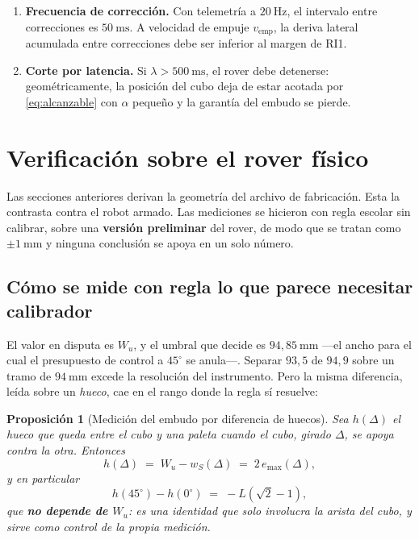 \documentclass[11pt,a4paper]{article}
\newtheorem{proposicion}[teorema]{Proposición}
\theoremstyle{definition}
\newcommand{\grados}{^{\circ}}
\begin{document}
\begin{enumerate}[label=RI\arabic*.,leftmargin=3em,itemsep=3pt]
      diferencial con giróscopo es razonable. La diferencia entre \emph{imposible} y
      \emph{razonable} es \emph{únicamente} conocer la inclinación del cubo.
\item \textbf{Frecuencia de corrección.} Con telemetría a $20\ \mathrm{Hz}$, el intervalo
      entre correcciones es $50\ \mathrm{ms}$. A velocidad de empuje $v_{\mathrm{emp}}$,
      la deriva lateral acumulada entre correcciones debe ser inferior al margen de RI1.
\item \textbf{Corte por latencia.} Si $\lambda > 500\ \mathrm{ms}$, el rover debe
      detenerse: geométricamente, la posición del cubo deja de estar acotada por
      \eqref{eq:alcanzable} con $\alpha$ pequeño y la garantía del embudo se pierde.
\end{enumerate}

\section{Verificación sobre el rover físico}
\label{sec:medicion}

Las secciones anteriores derivan la geometría del archivo de fabricación. Esta la
contrasta contra el robot armado. Las mediciones se hicieron con regla escolar sin
calibrar, sobre una \textbf{versión preliminar} del rover, de modo que se tratan como
$\pm 1\ \mathrm{mm}$ y ninguna conclusión se apoya en un solo número.

\subsection{Cómo se mide con regla lo que parece necesitar calibrador}

El valor en disputa es $W_u$, y el umbral que decide es $94{,}85\ \mathrm{mm}$
---el ancho para el cual el presupuesto de control a $45\grados$ se anula---. Separar
$93{,}5$ de $94{,}9$ sobre un tramo de $94\ \mathrm{mm}$ excede la resolución del
instrumento. Pero la misma diferencia, leída sobre un \emph{hueco}, cae en el rango donde
la regla sí resuelve:

\begin{proposicion}[Medición del embudo por diferencia de huecos]
\label{prop:huecos}
Sea $h(\Delta)$ el hueco que queda entre el cubo y una paleta cuando el cubo, girado
$\Delta$, se apoya contra la otra. Entonces
\begin{equation}
  h(\Delta) \;=\; W_u - w_S(\Delta) \;=\; 2\,e_{\max}(\Delta),
  \label{eq:hueco}
\end{equation}
y en particular
\begin{equation}
  h(45\grados) - h(0\grados) \;=\; -L(\sqrt2 - 1),
  \label{eq:control-huecos}
\end{equation}
que \textbf{no depende de $W_u$}: es una identidad que solo involucra la arista del cubo,
y sirve como control de la propia medición.
\end{proposicion}
\end{document}
